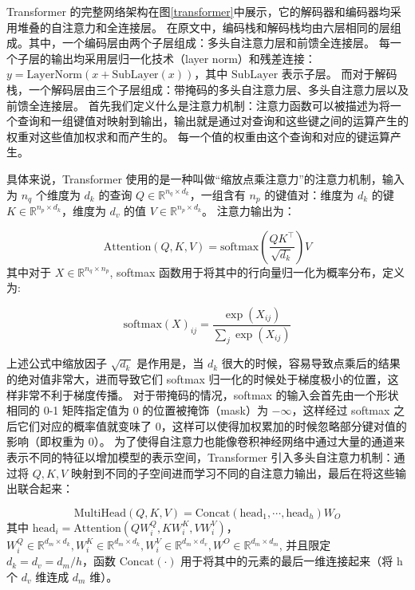 Transformer 的完整网络架构在图\ref{transformer}中展示，它的解码器和编码器均采用堆叠的自注意力和全连接层。
在原文中，编码栈和解码栈均由六层相同的层组成。其中，一个编码层由两个子层组成：多头自注意力层和前馈全连接层。
每一个子层的输出均采用层归一化技术（layer norm）和残差连接：$y = \text{LayerNorm}(x + \text{SubLayer}(x))$，其中 $\text{SubLayer}$ 表示子层。
而对于解码栈，一个解码层由三个子层组成：带掩码的多头自注意力层、多头自注意力层以及前馈全连接层。
首先我们定义什么是注意力机制：注意力函数可以被描述为将一个查询和一组键值对映射到输出，输出就是通过对查询和这些键之间的运算产生的权重对这些值加权求和而产生的。
每一个值的权重由这个查询和对应的键运算产生。

具体来说，Transformer 使用的是一种叫做“缩放点乘注意力”的注意力机制，输入为 $n_q$ 个维度为 $d_k$ 的查询 $Q \in \mathbb{R}^{n_q \times d_k}$，一组含有 $n_p$ 的键值对：维度为 $d_k$ 的键 $K \in \mathbb{R}^{n_p \times d_k}$，维度为 $d_v$ 的值 $V \in \mathbb{R}^{n_p \times d_k}$。
注意力输出为：

\begin{equation}
	\text{Attention} (Q, K, V) = \text{softmax}(\frac{QK^\top}{\sqrt{d_k}}) V
\end{equation}
其中对于 $X \in \mathbb{R}^{n_q \times n_p}$, softmax 函数用于将其中的行向量归一化为概率分布，定义为:

\begin{equation}
	\text{softmax}(X)_{ij} = \frac{\exp(X_{ij})}{\sum_j \exp(X_{ij})}
\end{equation}

上述公式中缩放因子 $\sqrt{d_k}$ 是作用是，当 $d_k$ 很大的时候，容易导致点乘后的结果的绝对值非常大，进而导致它们 softmax 归一化的时候处于梯度极小的位置，这样非常不利于梯度传播。
对于带掩码的情况，softmax 的输入会首先由一个形状相同的 0-1 矩阵指定值为 0 的位置被掩饰（mask）为 $-\infty$，这样经过 softmax 之后它们对应的概率值就变味了 $0$，这样可以使得加权累加的时候忽略部分键对值的影响（即权重为 0）。
为了使得自注意力也能像卷积神经网络中通过大量的通道来表示不同的特征以增加模型的表示空间，Transformer 引入多头自注意力机制：通过将 $Q,K,V$ 映射到不同的子空间进而学习不同的自注意力输出，最后在将这些输出联合起来：

\begin{equation}
	\text{MultiHead}(Q,K,V) = \text{Concat}(\text{head}_1,\cdots,\text{head}_h) W_O
\end{equation}
其中 $\text{head}_i = \text{Attention}(Q W_i^Q, KW_i^K, VW_i^V)$，$W_i^Q \in \mathbb{R}^{d_m \times d_k}, W_i^K \in \mathbb{R}^{d_m \times d_k}, W_i^V \in \mathbb{R}^{d_m \times d_v}, W^O \in \mathbb{R}^{d_m \times d_m}$, 并且限定 $d_k = d_v = d_m / h$，函数 $\text{Concat}(\cdot)$ 用于将其中的元素的最后一维连接起来（将 h 个 $d_v$ 维连成 $d_m$ 维）。

